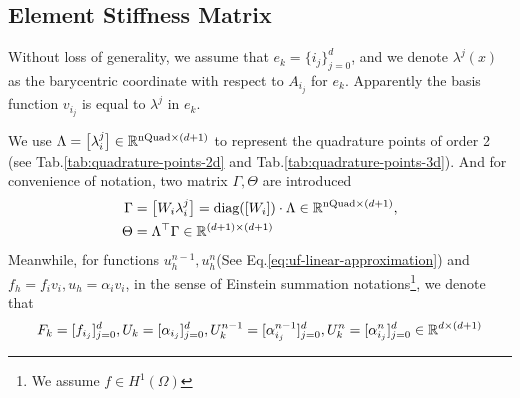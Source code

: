 \subsection{Element Stiffness Matrix}
Without loss of generality, we assume that $e_k=\{i_j\}_{j=0}^d$, 
and we denote $\lambda^j(x)$ as the barycentric coordinate with respect to $A_{i_j}$ for $e_k$. 
Apparently the basis function $v_{i_j}$ is equal to $\lambda^j$ in $e_k$.

We use $\Lambda=\big[\lambda_i^j\big]\in\mathbb{R}^{\text{nQuad}\times(d+1)}$
to represent the quadrature points of order 2
(see Tab.\ref{tab:quadrature-points-2d} and Tab.\ref{tab:quadrature-points-3d}). 
And for convenience of notation, two matrix $\Gamma,\Theta$ are introduced
\begin{equation*}
  \begin{split}
    \Gamma&=\big[W_i\lambda_i^j\big]=\text{diag}([W_i])\cdot\Lambda\in\mathbb{R}^{\text{nQuad}\times(d+1)},\\
    \Theta&=\Lambda^\top\Gamma\in\mathbb{R}^{(d+1)\times(d+1)}
  \end{split}
\end{equation*}
Meanwhile, for functions $u_h^{n-1},u_h^n$(See Eq.\eqref{eq:uf-linear-approximation}) and $f_h=f_iv_i,u_h=\alpha_iv_i$, 
in the sense of Einstein summation notations\footnote{We assume $f\in H^1(\Omega)$}, we denote that
\[
  F_k=[f_{i_j}]_{j=0}^{d},U_k=[\alpha_{i_j}]_{j=0}^d,
  U_{k}^{n-1}=[\alpha_{i_j}^{n-1}]_{j=0}^{d},
  U_{k}^{n}=[\alpha_{i_j}^{n}]_{j=0}^{d}\in\mathbb{R}^{d\times(d+1)}
\]


